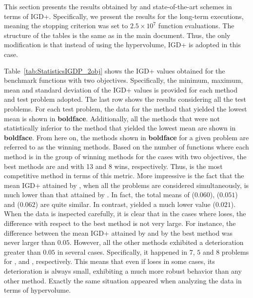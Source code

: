 



This section presents the results obtained by \VSDMOEA{} and state-of-the-art schemes in terms of
IGD+\cite{Joel:Inverted_Generational_Distance_Plus}.
%
Specifically, we present the results for the long-term executions, meaning
the stopping criterion was set to $2.5 \times 10^7$ function evaluations.
%
The structure of the tables is the same as in the main document.
%
Thus, the only modification is that instead of using the hypervolume, IGD+ is adopted in this case.

Table~\ref{tab:StatisticsIGDP_2obj} shows the IGD+ values obtained for the benchmark functions with two objectives.
%
Specifically, the minimum, maximum, mean and standard deviation of the IGD+ values is provided 
for each method and test problem adopted.
%
The last row shows the results considering all the test problems.
%
For each test problem, the data for the method that yielded the lowest mean is shown in {\bf boldface}.
%
Additionally, all the methods that were not statistically inferior to the method that yielded
the lowest mean are shown in {\bf boldface}.
%
From here on, the methods shown in {\bf boldface} for a given problem are referred to as the winning methods.
%
Based on the number of functions where each method is in the group of winning methods for the cases 
with two objectives, the best methods are \VSDMOEA{} and \RMOEA{} with 13 and 8 wins, respectively.
%
Thus, \VSDMOEA{} is the most competitive method in terms of this metric.
%
More impressive is the fact that the mean IGD+ attained by \VSDMOEA{}, when all the problems are considered simultaneously, is much lower 
than that attained by \RMOEA{}.
%
In fact, the total means of \RMOEA{} ($0.060$), \NSGAII{} ($0.051$) and \MOEAD{} ($0.062$) are quite similar.
%
In contrast, \VSDMOEA{} yielded a much lower value ($0.021$).
%
When the data is inspected carefully, it is clear that in the cases where \VSDMOEA{} loses, the difference with respect to the
best method is not very large.
%
For instance, the difference between the mean IGD+ attained by \VSDMOEA{} and by the best method was never larger
than $0.05$.
%
However, all the other methods exhibited a deterioration greater than $0.05$ in several cases.
%
Specifically, it happened in $7$, $5$ and $8$ problems for \MOEAD{}, \NSGAII{} and \RMOEA{}, respectively.
%
This means that even if \VSDMOEA{} loses in some cases, its deterioration is always small, exhibiting a much more 
robust behavior than any other method.
%
Exactly the same situation appeared when analyzing the data in terms of hypervolume.

